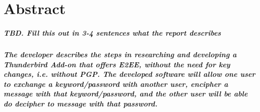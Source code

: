\chapter{Abstract}
\paragraph{TBD. Fill this out in 3-4 sentences what the report describes}

\paragraph{The developer describes the steps in researching and developing a Thunderbird Add-on that offers E2EE, without the need for key changes, i.e. without PGP. The developed software will allow one user to exchange a keyword/password with another user, encipher a message with that keyword/password, and the other user will be able do decipher to message with that password.}